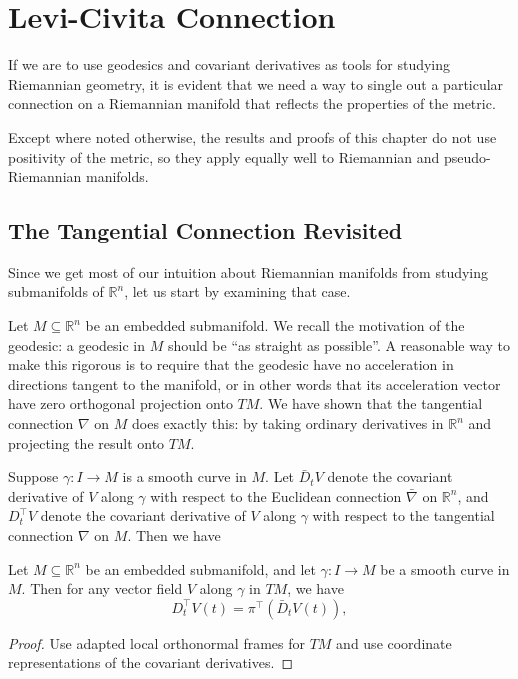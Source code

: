 \documentclass[../main.tex]{subfiles}
\begin{document}
\chapter{Levi-Civita Connection}

If we are to use geodesics and covariant derivatives as tools for studying Riemannian geometry, it is evident that we need a way to single out a particular connection on a Riemannian manifold that reflects the properties of the metric.

Except where noted otherwise, the results and proofs of this chapter do not use positivity of the metric, so they apply equally well to Riemannian and pseudo-Riemannian manifolds.

\section{The Tangential Connection Revisited}
Since we get most of our intuition about Riemannian manifolds from studying submanifolds of $\mathbb{R}^n$, let us start by examining that case.

Let $M \subseteq \mathbb{R}^n$ be an embedded submanifold. We recall the motivation of the geodesic: a geodesic in $M$ should be ``as straight as possible''. A reasonable way to make this rigorous is to require that the geodesic have no acceleration in directions tangent to the manifold, or in other words that its acceleration vector have zero orthogonal projection onto $TM$. We have shown that the tangential connection $\nabla$ on $M$ does exactly this: by taking ordinary derivatives in $\mathbb{R}^n$ and projecting the result onto $TM$.

Suppose $\gamma: I \to M$ is a smooth curve in $M$. Let $\bar{D}_t V$ denote the covariant derivative of $V$ along $\gamma$ with respect to the Euclidean connection $\bar{\nabla}$ on $\mathbb{R}^n$, and $D_t^\top V$ denote the covariant derivative of $V$ along $\gamma$ with respect to the tangential connection $\nabla$ on $M$. Then we have

\begin{proposition}{}{}
	Let $M \subseteq \mathbb{R}^n$ be an embedded submanifold, and let $\gamma: I \to M$ be a smooth curve in $M$. Then for any vector field $V$ along $\gamma$ in $TM$, we have
	\begin{equation}
		D_t^\top V(t) = \pi^\top(\bar{D}_t V(t)),
	\end{equation}
\end{proposition}
\begin{proof}
	Use adapted local orthonormal frames for $TM$ and use coordinate representations of the covariant derivatives.
\end{proof}
\end{document}
